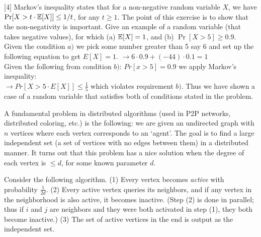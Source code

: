 \documentclass[addpoints]{exam}
\begin{document}
\begin{questions}

  [4]
  Markov's inequality states that for a non-negative random variable $X$, we have $\Pr[ X > t \cdot \mathbb{E}[X] ] \le 1/t$, for any $t \ge 1$.
  The point of this exercise is to show that the non-negativity is important. Give an example of a random variable (that takes negative values), for which (a) $\mathbb{E}[X] = 1$, and (b) $\Pr[ X > 5] \ge 0.9$. \\

  Given the condition $a)$ we pick some number greater than 5 say 6 and set up the following equation to get $E[X] = 1$.
  $\rightarrow 6 \cdot 0.9 + (-44) \cdot 0.1 = 1$ \\
  Given the following from condition $b)$: $Pr[x > 5] = 0.9$ we apply Markov's inequality: \\
  $\rightarrow Pr[X > 5 \cdot E[X]] \leq \frac{1}{5}$ which violates requirement $b)$.
  Thus we have shown a case of a random variable that satisfies both of conditions stated in the problem.

  A fundamental problem in distributed algorithms (used in P2P networks, distributed coloring, etc.) is the following:  we are given an undirected graph with $n$ vertices where each vertex corresponds to an `agent'. The goal is to find a large independent set (a set of vertices with no edges between them) in a distributed manner. It turns out that this problem has a nice solution when the degree of each vertex is $\le d$, for some known parameter $d$.

  Consider the following algorithm. (1) Every vertex becomes {\em active} with probability $\frac{1}{2d}$.  (2) Every active vertex queries its neighbors, and if any vertex in the neighborhood is also active, it becomes inactive. (Step (2) is done in parallel; thus if $i$ and $j$ are neighbors and they were both activated in step (1), they both become inactive.) (3) The set of active vertices in the end is output as the independent set.

\end{questions}
\end{document}
